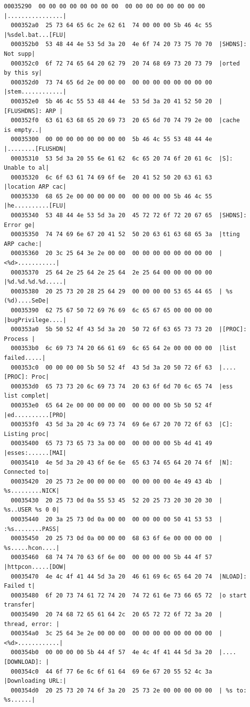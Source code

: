 \documentclass[]{project_plan}
\begin{document}
\begin{lstlisting}[basicstyle=\tiny]
  00035290  00 00 00 00 00 00 00 00  00 00 00 00 00 00 00 00  |................|
  000352a0  25 73 64 65 6c 2e 62 61  74 00 00 00 5b 46 4c 55  |%sdel.bat...[FLU|
  000352b0  53 48 44 4e 53 5d 3a 20  4e 6f 74 20 73 75 70 70  |SHDNS]: Not supp|
  000352c0  6f 72 74 65 64 20 62 79  20 74 68 69 73 20 73 79  |orted by this sy|
  000352d0  73 74 65 6d 2e 00 00 00  00 00 00 00 00 00 00 00  |stem............|
  000352e0  5b 46 4c 55 53 48 44 4e  53 5d 3a 20 41 52 50 20  |[FLUSHDNS]: ARP |
  000352f0  63 61 63 68 65 20 69 73  20 65 6d 70 74 79 2e 00  |cache is empty..|
  00035300  00 00 00 00 00 00 00 00  5b 46 4c 55 53 48 44 4e  |........[FLUSHDN|
  00035310  53 5d 3a 20 55 6e 61 62  6c 65 20 74 6f 20 61 6c  |S]: Unable to al|
  00035320  6c 6f 63 61 74 69 6f 6e  20 41 52 50 20 63 61 63  |location ARP cac|
  00035330  68 65 2e 00 00 00 00 00  00 00 00 00 5b 46 4c 55  |he..........[FLU|
  00035340  53 48 44 4e 53 5d 3a 20  45 72 72 6f 72 20 67 65  |SHDNS]: Error ge|
  00035350  74 74 69 6e 67 20 41 52  50 20 63 61 63 68 65 3a  |tting ARP cache:|
  00035360  20 3c 25 64 3e 2e 00 00  00 00 00 00 00 00 00 00  | <%d>...........|
  00035370  25 64 2e 25 64 2e 25 64  2e 25 64 00 00 00 00 00  |%d.%d.%d.%d.....|
  00035380  20 25 73 20 28 25 64 29  00 00 00 00 53 65 44 65  | %s (%d)....SeDe|
  00035390  62 75 67 50 72 69 76 69  6c 65 67 65 00 00 00 00  |bugPrivilege....|
  000353a0  5b 50 52 4f 43 5d 3a 20  50 72 6f 63 65 73 73 20  |[PROC]: Process |
  000353b0  6c 69 73 74 20 66 61 69  6c 65 64 2e 00 00 00 00  |list failed.....|
  000353c0  00 00 00 00 5b 50 52 4f  43 5d 3a 20 50 72 6f 63  |....[PROC]: Proc|
  000353d0  65 73 73 20 6c 69 73 74  20 63 6f 6d 70 6c 65 74  |ess list complet|
  000353e0  65 64 2e 00 00 00 00 00  00 00 00 00 5b 50 52 4f  |ed..........[PRO|
  000353f0  43 5d 3a 20 4c 69 73 74  69 6e 67 20 70 72 6f 63  |C]: Listing proc|
  00035400  65 73 73 65 73 3a 00 00  00 00 00 00 5b 4d 41 49  |esses:......[MAI|
  00035410  4e 5d 3a 20 43 6f 6e 6e  65 63 74 65 64 20 74 6f  |N]: Connected to|
  00035420  20 25 73 2e 00 00 00 00  00 00 00 00 4e 49 43 4b  | %s.........NICK|
  00035430  20 25 73 0d 0a 55 53 45  52 20 25 73 20 30 20 30  | %s..USER %s 0 0|
  00035440  20 3a 25 73 0d 0a 00 00  00 00 00 00 50 41 53 53  | :%s........PASS|
  00035450  20 25 73 0d 0a 00 00 00  68 63 6f 6e 00 00 00 00  | %s.....hcon....|
  00035460  68 74 74 70 63 6f 6e 00  00 00 00 00 5b 44 4f 57  |httpcon.....[DOW|
  00035470  4e 4c 4f 41 44 5d 3a 20  46 61 69 6c 65 64 20 74  |NLOAD]: Failed t|
  00035480  6f 20 73 74 61 72 74 20  74 72 61 6e 73 66 65 72  |o start transfer|
  00035490  20 74 68 72 65 61 64 2c  20 65 72 72 6f 72 3a 20  | thread, error: |
  000354a0  3c 25 64 3e 2e 00 00 00  00 00 00 00 00 00 00 00  |<%d>............|
  000354b0  00 00 00 00 5b 44 4f 57  4e 4c 4f 41 44 5d 3a 20  |....[DOWNLOAD]: |
  000354c0  44 6f 77 6e 6c 6f 61 64  69 6e 67 20 55 52 4c 3a  |Downloading URL:|
  000354d0  20 25 73 20 74 6f 3a 20  25 73 2e 00 00 00 00 00  | %s to: %s......|
\end{lstlisting}
\end{document}
